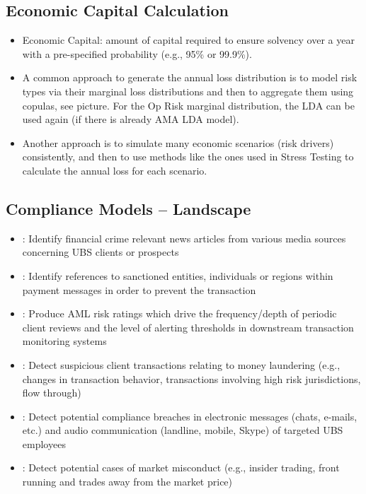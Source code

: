 \subsection*{Economic Capital Calculation}
\begin{itemize}[leftmargin=*]
    \item Economic Capital: amount of capital required to ensure solvency over a year with a pre-specified probability (e.g., 95\% or 99.9\%).
    \item A common approach to generate the annual loss distribution is to model risk types via their marginal loss distributions and then to
aggregate them using copulas, see picture. For the Op Risk marginal distribution, the LDA can be used again (if there is already AMA LDA
model).
    \item Another approach is to simulate many economic scenarios (risk drivers) consistently, and then to use methods like the ones used in Stress
Testing to calculate the annual loss for each scenario.
\end{itemize}







\subsection*{Compliance Models – Landscape}
\begin{itemize}[leftmargin=*]
    \item {}: Identify financial crime relevant news articles from various media sources concerning UBS clients or prospects
    \item {}: Identify references to sanctioned
entities, individuals or regions
within payment messages in
order to prevent the transaction
    \item {}: Produce AML risk ratings which
drive the frequency/depth of
periodic client reviews and the
level of alerting thresholds in
downstream transaction
monitoring systems
    \item {}: Detect suspicious client
transactions relating to money
laundering (e.g., changes in
transaction behavior,
transactions involving high risk
jurisdictions, flow through)
    \item {}: Detect potential compliance
breaches in electronic
messages (chats, e-mails, etc.)
and audio communication
(landline, mobile, Skype) of
targeted UBS employees
    \item {}: Detect potential cases of
market misconduct (e.g.,
insider trading, front running
and trades away from the
market price)
\end{itemize}





